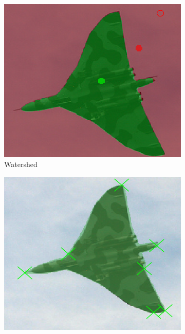 \begin{figure}
	\\	
	\begin{subfigure}[t]{0.3\textwidth}
		\centering
		\includegraphics[width=\textwidth]{figures/appendix/method_predictions/jet4_watershed.png}
		\caption{
			Watershed
		}
	\end{subfigure}
	\hfill
	\begin{subfigure}[t]{0.3\textwidth}
		\centering
		\includegraphics[width=\textwidth]{figures/appendix/method_predictions/jet4_dextr.png}

\end{subfigure}
\end{figure}
